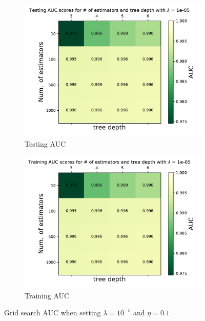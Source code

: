 \documentclass[12pt, a4paper]{book}
\begin{document}
\begin{figure}[!ht]
\centering
\begin{subfigure}[b]{0.49\textwidth}
      \centering
      \includegraphics[width=1\textwidth]{Testing_AUC.pdf}
      \caption{Testing AUC}
   \end{subfigure}
   \hfill
   \begin{subfigure}[b]{0.49\textwidth}
      \centering
      \includegraphics[width=1\textwidth]{Training_AUC.pdf}
      \caption{Training AUC}
   \end{subfigure}
   \caption[Grid search result for BDT]{Grid search AUC when setting $\lambda=10^{-5}$ and $\eta=0.1$}\label{fig:BDT_GRID_AUC}
\end{figure}
\end{document}
